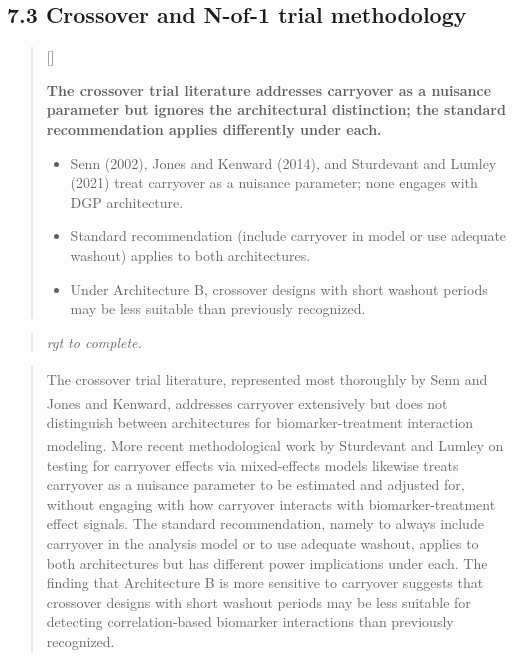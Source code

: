 \documentclass[
  11pt,
]{article}
\newcounter{pgraph}
\newenvironment{bullets}{%
  \stepcounter{pgraph}%
  \begin{quote}\small\sffamily\color[gray]{0.30}%
  {\normalfont\scriptsize\color[gray]{0.58}[\thepgraph]\enspace}}{%
  \end{quote}}
\newenvironment{rgt}{%
  \begin{quote}\small\itshape\color[RGB]{20,60,160}}{%
  \end{quote}}
\newenvironment{orig}{%
  \begin{quote}\normalsize\color[gray]{0.55}}{%
  \end{quote}}
\begin{document}
\subsection{7.3 Crossover and N-of-1 trial methodology}

\begin{bullets}

\textbf{The crossover trial literature addresses carryover as a
nuisance parameter but ignores the architectural distinction;
the standard recommendation applies differently under each.}

\begin{itemize}\setlength{\itemsep}{2pt}\setlength{\parskip}{0pt}
\item Senn (2002), Jones and Kenward (2014), and Sturdevant and
  Lumley (2021) treat carryover as a nuisance parameter; none
  engages with DGP architecture.
\item Standard recommendation (include carryover in model or
  use adequate washout) applies to both architectures.
\item Under Architecture B, crossover designs with short
  washout periods may be less suitable than previously
  recognized.
\end{itemize}

\end{bullets}

\begin{rgt}
rgt to complete.

\end{rgt}

\begin{orig}
The crossover trial literature, represented most thoroughly by
Senn\textsuperscript{} and Jones and
Kenward\textsuperscript{},
addresses carryover extensively but does not distinguish between
architectures for biomarker-treatment interaction modeling. More recent
methodological work by Sturdevant and
Lumley\textsuperscript{} on
testing for carryover effects via mixed-effects models likewise treats
carryover as a nuisance parameter to be estimated and adjusted for,
without engaging with how carryover interacts with biomarker-treatment
effect signals. The standard recommendation, namely to always include
carryover in the analysis model or to use adequate washout, applies to
both architectures but has different power implications under each. The
finding that Architecture B is more sensitive to carryover suggests that
crossover designs with short washout periods may be less suitable for
detecting correlation-based biomarker interactions than previously
recognized.

\end{orig}
\end{document}
